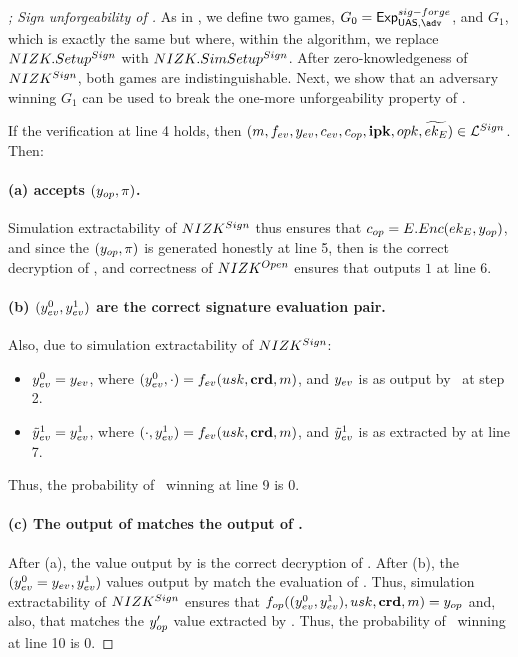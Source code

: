 \begin{proof}[; Sign unforgeability of \CUASGen]
  As in , we define two games, $G_0=\ExpForgeSign$,
  and $G_1$, which is exactly the same but where, within the \Setup algorithm,
  we replace $NIZK.Setup^{Sign}$ with $NIZK.SimSetup^{Sign}$. After
  zero-knowledgeness of $NIZK^{Sign}$, both games are indistinguishable.
  Next, we show that an adversary winning $G_1$ can be used to break the
  one-more unforgeability property of \SBCM.
 
  If the verification at line 4 holds, then $(m,f_{ev},y_{ev},c_{ev},
  c_{op},\mathbf{ipk},opk,\widetilde{ek_{E}}) \in \mathcal{L}^{Sign}$. Then:

  \paragraph{(a) \Judge accepts $(y_{op},\pi)$.} %
  Simulation extractability of $NIZK^{Sign}$ thus ensures that $c_{op} =
  E.Enc(ek_{E},y_{op})$, and since the $(y_{op},\pi)$ is generated honestly at
  line 5, then \yinsp is the correct decryption of \cinsp, and  correctness of
  $NIZK^{Open}$ ensures that \Judge outputs $1$ at line 6.

  \paragraph{(b) $(y_{ev}^0,y_{ev}^1)$ are the correct signature evaluation
    pair.} Also, due to simulation extractability of $NIZK^{Sign}$:

  \begin{itemize}
  \item $y_{ev}^0 = y_{ev}$, where $(y_{ev}^0,\cdot) = f_{ev}(usk,\mathbf{crd},
    m)$, and $y_{ev}$ is as output by \adv~at step 2.    
  \item $\tilde{y}_{ev}^1 = y_{ev}^1$, where $(\cdot,y_{ev}^1) = f_{ev}(usk,\mathbf{crd},
    m)$, and $\tilde{y}_{ev}^1$ is as extracted by \ExtractSign at line 7.
  \end{itemize}

  Thus, the probability of \adv~winning at line 9 is $0$.

  \paragraph{(c) The output of \finsp matches the output of \Open.} %
  After (a), the \yinsp value output by \Open is the correct decryption of
  \cinsp. After (b), the $(y_{ev}^0=y_{ev},y_{ev}^1)$ values output by
  \ExtractSign match the evaluation of \feval. Thus, simulation extractability
  of $NIZK^{Sign}$ ensures that $f_{op}((y_{ev}^0,y_{ev}^1),usk,\mathbf{crd},m)
  = y_{op}$ and, also, that \yinsp matches the $y_{op}'$ value extracted by
  \ExtractSign. Thus, the probability of \adv~winning at line 10 is $0$.


\end{proof}
